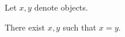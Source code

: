 \begin{forthel}
    Let $x, y$ denote objects.

    \begin{lemma}
        There exist $x , y$ such that $x = y$.
    \end{lemma}
\end{forthel}
